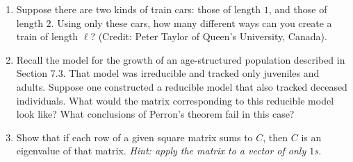 \documentclass[11pt]{article}
\begin{document}
\begin{enumerate}
\begin{enumerate}
        \[
          p_{i|1} = 
          \begin{cases}
            0.5 & \text{if } i=1 \\
            0.2 & \text{if } i=2 \\
            0.3 & \text{if } i=3
          \end{cases}
          \quad
          p_{i|2} = 
          \begin{cases}
            0.2 & \text{if } i=1 \\
            0.6 & \text{if } i=2 \\
            0.2 & \text{if } i=3
          \end{cases}
          \quad
          p_{i|3} = 
          \begin{cases}
            0.6 & \text{if } i=1 \\
            0.1 & \text{if } i=2 \\
            0.3 & \text{if } i=3
          \end{cases}
        \]
        then how much time would we predict the bird spends performing each activity in the long run?

      \item Suppose there are two kinds of train cars: those of length $1$, and those of length $2$. Using only these cars, how many different ways can you create a train of length $\ell$? (Credit: Peter Taylor of Queen's University, Canada).

      \item Recall the model for the growth of an age-structured population described in Section 7.3. That model was irreducible and tracked only juveniles and adults. Suppose one constructed a reducible model that also tracked deceased individuals. What would the matrix corresponding to this reducible model look like? What conclusions of Perron's theorem fail in this case?

      \item Show that if each row of a given square matrix sums to $C$, then $C$ is an eigenvalue of that matrix. {\it Hint: apply the matrix to a vector of only $1$s.}
    \end{enumerate}


\end{enumerate}
\end{document}
